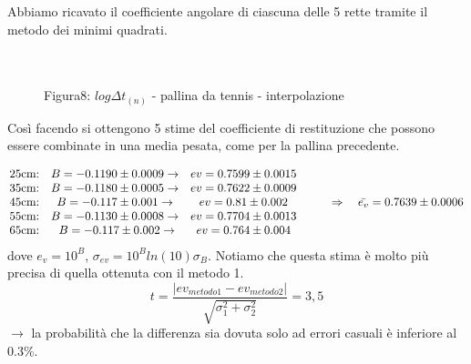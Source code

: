 \documentclass[a4paper]{article}
\theoremstyle{definition}
\begin{document}
	\noindent Abbiamo ricavato il coefficiente angolare di ciascuna delle 5 rette tramite il metodo dei minimi quadrati.\\\\\\
	\begin{figure}[!ht]
		\captionsetup{labelformat=empty}
		\caption{ Figura8: \(log\Delta t _{(n)}\) - pallina da tennis - interpolazione}
	\end{figure}
	
	\noindent Così facendo si ottengono 5 stime del coefficiente di restituzione che possono essere combinate in una media pesata, come per la pallina precedente.
	
	\[\begin{matrix}
		$25cm:$ &$\(B=-0.1190\pm 0.0009\rightarrow\)$ & $\(ev =0.7599\pm0.0015\)$ &  \\ 
		$35cm:$ & $\(B=-0.1180\pm 0.0005 \rightarrow\)$& $\(ev =0.7622\pm0.0009\)$ &  \\ 
		$45cm:$ & $\(B=-0.117\pm 0.001\rightarrow\)$& $\(ev = 0.81 \pm 0.002\)$ & $\(\qquad \Rightarrow \quad \bar{e_{v}} = 0.7639\pm 0.0006\)$\\ 
		$55cm:$ & $\(B=-0.1130\pm 0.0008\rightarrow\)$& $\(ev = 0.7704\pm0.0013\)$ &  \\ 
		$65cm:$ & $ \( B = -0.117 \pm 0.002\rightarrow\)$& $\(ev =0.764\pm0.004\)$ & 
	\end{matrix}\]
	dove \(e_{v}= 10^{B}\), \(\sigma_{ev} = 10^{B}ln(10)\sigma_{B}\). Notiamo che questa stima è molto più precisa di quella ottenuta con il metodo 1.
		\[t = \frac{ \left |ev_{metodo1}  - ev_{metodo2} \right |}{\sqrt{\sigma_{1}^{2}+ \sigma_{2}^{2}}} = 3,5  \]
	\noindent \(\rightarrow\) la probabilità che la differenza sia dovuta solo ad errori casuali è inferiore al 0.3\(\%\).
\end{document}
